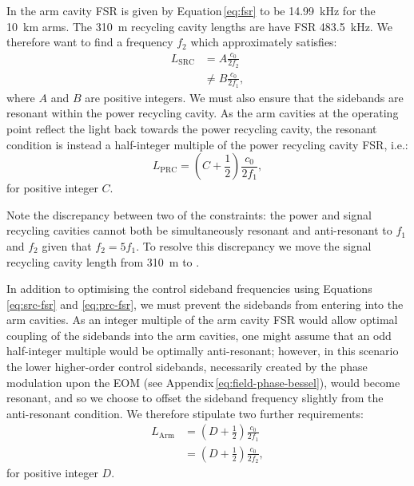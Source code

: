 In \ETLF{} the arm cavity \gls{FSR} is given by Equation\,\ref{eq:fsr} to be \SI{14.99}{\kilo\hertz} for the \SI{10}{\kilo\meter} arms. The \SI{310}{\meter} recycling cavity lengths are have \gls{FSR} \SI{483.5}{\kilo\hertz}. We therefore want to find a frequency $f_2$ which approximately satisfies:
\begin{equation}
  \label{eq:src-fsr}
  \begin{split}
    L_{\text{SRC}} &= A \frac{c_0}{2 f_2} \\
                   &\neq B \frac{c_0}{2 f_1},
  \end{split}
\end{equation}
where $A$ and $B$ are positive integers. We must also ensure that the sidebands are resonant within the power recycling cavity. As the arm cavities at the operating point reflect the light back towards the power recycling cavity, the resonant condition is instead a half-integer multiple of the power recycling cavity \gls{FSR}, i.e.:
\begin{equation}
  \label{eq:prc-fsr}
  L_{\text{PRC}} = \left(C + \frac{1}{2} \right) \frac{c_0}{2 f_1},
\end{equation}
for positive integer $C$.

Note the discrepancy between two of the constraints: the power and signal recycling cavities cannot both be simultaneously resonant and anti-resonant to $f_1$ and $f_2$ given that $f_2 = 5 f_1$. To resolve this discrepancy we move the signal recycling cavity length from \SI{310}{\meter} to .

In addition to optimising the control sideband frequencies using Equations \ref{eq:src-fsr} and \ref{eq:prc-fsr}, we must prevent the sidebands from entering into the arm cavities. As an integer multiple of the arm cavity \gls{FSR} would allow optimal coupling of the sidebands into the arm cavities, one might assume that an odd half-integer multiple would be optimally anti-resonant; however, in this scenario the lower higher-order control sidebands, necessarily created by the phase modulation upon the \gls{EOM} (see Appendix\,\ref{eq:field-phase-bessel}), would become resonant, and so we choose to offset the sideband frequency slightly from the anti-resonant condition. We therefore stipulate two further requirements:
\begin{equation}
  \label{eq:arm-fsr}
  \begin{split}
    L_{\text{Arm}} &= \left(D + \frac{1}{2} \right) \frac{c_0}{2 f_1} \\
                   &= \left(D + \frac{1}{2} \right) \frac{c_0}{2 f_2},
  \end{split}
\end{equation}
for positive integer $D$.

